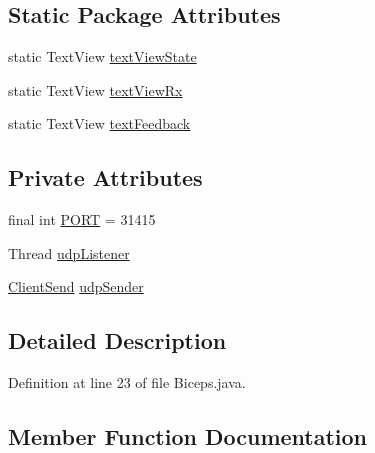 \subsection*{Static Package Attributes}
\begin{DoxyCompactItemize}
\item 
static Text\+View \mbox{\hyperlink{classcom_1_1example_1_1trainawearapplication_1_1_biceps_ae385412b8ad17ab4bda6561d405b117c}{text\+View\+State}}
\item 
static Text\+View \mbox{\hyperlink{classcom_1_1example_1_1trainawearapplication_1_1_biceps_a36a9f57755bc33b820b2922ccc4dc864}{text\+View\+Rx}}
\item 
static Text\+View \mbox{\hyperlink{classcom_1_1example_1_1trainawearapplication_1_1_biceps_a2968dc5812ea82dc5df7cfa5d2f9b415}{text\+Feedback}}
\end{DoxyCompactItemize}
\subsection*{Private Attributes}
\begin{DoxyCompactItemize}
\item 
final int \mbox{\hyperlink{classcom_1_1example_1_1trainawearapplication_1_1_biceps_adb998a91a1fac06d100f9c192df14bbe}{P\+O\+RT}} = 31415
\item 
Thread \mbox{\hyperlink{classcom_1_1example_1_1trainawearapplication_1_1_biceps_a066fa540c01d0299cab5c4a1a2cf2f5f}{udp\+Listener}}
\item 
\mbox{\hyperlink{classcom_1_1example_1_1trainawearapplication_1_1_client_send}{Client\+Send}} \mbox{\hyperlink{classcom_1_1example_1_1trainawearapplication_1_1_biceps_acfb63670051beb8e048beea485e8576a}{udp\+Sender}}
\end{DoxyCompactItemize}


\subsection{Detailed Description}


Definition at line 23 of file Biceps.\+java.



\subsection{Member Function Documentation}
\mbox{\label{classcom_1_1example_1_1trainawearapplication_1_1_biceps_abcdfd60742e9da12033fad625275ca4f}} 
